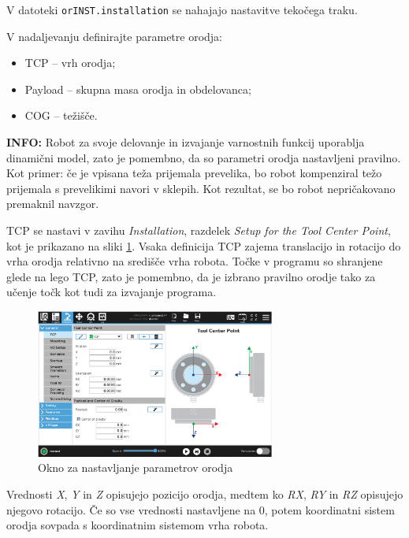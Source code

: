 V datoteki \verb"orINST.installation" se nahajajo nastavitve tekočega traku.

V nadaljevanju definirajte parametre orodja:
\begin{itemize}
  \item TCP -- vrh orodja;
  \item Payload -- skupna masa orodja in obdelovanca;
  \item COG -- težišče.
\end{itemize}

\begin{mdframed}[backgroundcolor=blue!20, shadow=true,roundcorner=8pt]
\textbf{INFO:} Robot za svoje delovanje in izvajanje varnostnih funkcij uporablja dinamični model, zato je pomembno, da so parametri orodja nastavljeni pravilno. Kot primer: če je vpisana teža prijemala prevelika, bo robot kompenziral težo prijemala s prevelikimi navori v sklepih. Kot rezultat, se bo robot nepričakovano premaknil navzgor.
\end{mdframed}


TCP se nastavi v zavihu \emph{Installation}, razdelek \emph{Setup for the Tool Center Point}, kot je prikazano na sliki \ref{fig:ur_install}. Vsaka definicija TCP zajema translacijo in rotacijo do vrha orodja relativno na središče vrha robota. Točke v programu so shranjene glede na lego TCP, zato je pomembno, da je izbrano pravilno orodje tako za učenje točk kot tudi za izvajanje programa.

\begin{figure}[!hbt]
\centering
 \includegraphics[width=0.7\textwidth]{ur5e_tcp.eps}
\caption{Okno za nastavljanje parametrov orodja}
\label{fig:ur_install}
\end{figure}


Vrednosti \emph{X}, \emph{Y} in \emph{Z} opisujejo pozicijo orodja, medtem ko \emph{RX}, \emph{RY} in \emph{RZ} opisujejo njegovo rotacijo. Če so vse vrednosti nastavljene na 0, potem koordinatni sistem orodja sovpada s koordinatnim sistemom vrha robota.


